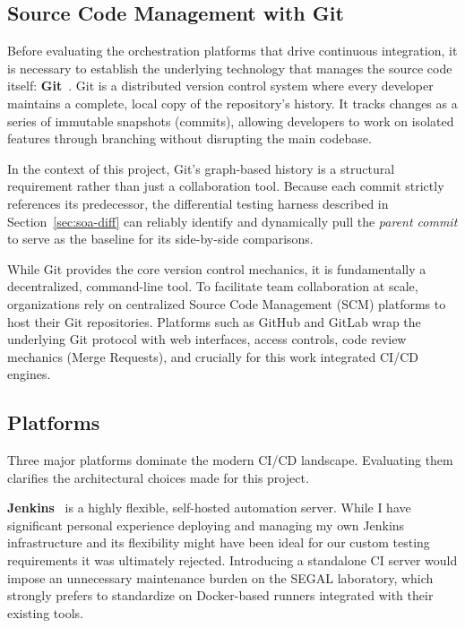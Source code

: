\subsection{Source Code Management with Git}
\label{sec:soa-git}

Before evaluating the orchestration platforms that drive continuous integration,
it is necessary to establish the underlying technology that manages the
source code itself: \textbf{Git}~\cite{git}. Git is a distributed version control
system where every developer maintains a complete, local copy of the
repository's history. It tracks changes as a series of immutable snapshots (commits),
allowing developers to work on isolated features through branching without
disrupting the main codebase.

In the context of this project, Git's graph-based history is a structural requirement
rather than just a collaboration tool. Because each commit strictly
references its predecessor, the differential testing harness described in Section~\ref{sec:soa-diff}
can reliably identify and dynamically pull the \emph{parent commit} to
serve as the baseline for its side-by-side comparisons.

While Git provides the core version control mechanics, it is fundamentally a
decentralized, command-line tool. To facilitate team collaboration at scale,
organizations rely on centralized Source Code Management (SCM) platforms to
host their Git repositories. Platforms such as GitHub and GitLab wrap the underlying
Git protocol with web interfaces, access controls, code review mechanics (Merge
Requests), and crucially for this work integrated \ac{CI}/\ac{CD} engines.
\subsection{Platforms}

Three major platforms dominate the modern \ac{CI}/\ac{CD} landscape. Evaluating
them clarifies the architectural choices made for this project.

\textbf{Jenkins}~\cite{jenkins} is a highly flexible, self-hosted automation
server. While I have significant personal experience deploying and managing
my own Jenkins infrastructure and its flexibility might have been ideal for
our custom testing requirements it was ultimately rejected. Introducing a standalone
\ac{CI} server would impose an unnecessary maintenance burden on the \ac{SEGAL}
laboratory, which strongly prefers to standardize on Docker-based runners
integrated with their existing tools.

